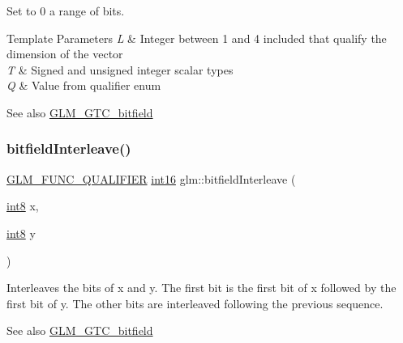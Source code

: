 Set to 0 a range of bits.


\begin{DoxyTemplParams}{Template Parameters}
{\em L} & Integer between 1 and 4 included that qualify the dimension of the vector \\
\hline
{\em T} & Signed and unsigned integer scalar types \\
\hline
{\em Q} & Value from qualifier enum\\
\hline
\end{DoxyTemplParams}
\begin{DoxySeeAlso}{See also}
\mbox{\hyperlink{group__gtc__bitfield}{G\+L\+M\+\_\+\+G\+T\+C\+\_\+bitfield}} 
\end{DoxySeeAlso}
\mbox{\label{group__gtc__bitfield_ga479134317bc95d99f2b2e235d3db287b}} 
\subsubsection{\texorpdfstring{bitfield\+Interleave()}{bitfieldInterleave()}\hspace{0.1cm}{\footnotesize\ttfamily [1/16]}}
{\footnotesize\ttfamily \mbox{\hyperlink{setup_8hpp_a33fdea6f91c5f834105f7415e2a64407}{G\+L\+M\+\_\+\+F\+U\+N\+C\+\_\+\+Q\+U\+A\+L\+I\+F\+I\+ER}} \mbox{\hyperlink{group__gtc__type__precision_ga2945a61d12771f8954994fcddf02b021}{int16}} glm\+::bitfield\+Interleave (\begin{DoxyParamCaption}\item[{\mbox{\hyperlink{group__gtc__type__precision_ga96254f9c1c4506fc8eb5cf3301ce8565}{int8}}}]{x,  }\item[{\mbox{\hyperlink{group__gtc__type__precision_ga96254f9c1c4506fc8eb5cf3301ce8565}{int8}}}]{y }\end{DoxyParamCaption})}

Interleaves the bits of x and y. The first bit is the first bit of x followed by the first bit of y. The other bits are interleaved following the previous sequence.

\begin{DoxySeeAlso}{See also}
\mbox{\hyperlink{group__gtc__bitfield}{G\+L\+M\+\_\+\+G\+T\+C\+\_\+bitfield}} 
\end{DoxySeeAlso}
\mbox{\label{group__gtc__bitfield_ga0700a3ceb088a0ecc23d76c154096061}} 
